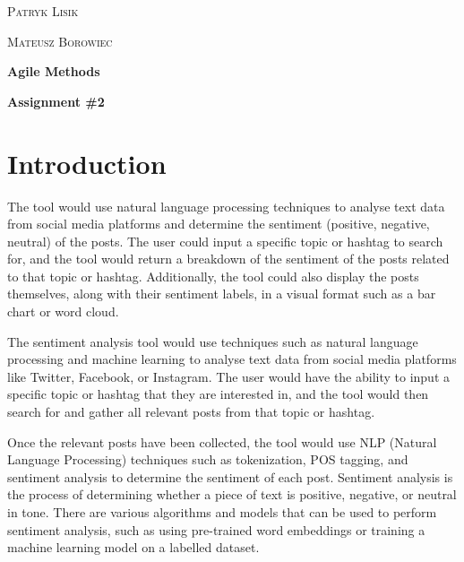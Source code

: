 \documentclass[a4paper,12pt]{article}
\begin{document}
\begin{titlepage}
\vspace{3cm}

\begin{minipage}{0.33 \textwidth}
\begin{flushleft}
\large
\textsc{Patryk Lisik}
\end{flushleft}
\end{minipage}
\hspace{0.2\textwidth}
\begin{minipage}{0.33 \textwidth}
\begin{flushleft}
\large
\textsc{Mateusz Borowiec}
\end{flushleft}
\end{minipage}

\vspace{2cm}

{\center\huge\bfseries Agile Methods \par}

\vspace{1.5cm}
{\center\huge\bfseries Assignment \#2\par}

\end{titlepage}
\section{Introduction}

The tool would use natural language processing techniques to analyse text data from social media platforms and determine the sentiment (positive, negative, neutral) of the posts. The user could input a specific topic or hashtag to search for, and the tool would return a breakdown of the sentiment of the posts related to that topic or hashtag. Additionally, the tool could also display the posts themselves, along with their sentiment labels, in a visual format such as a bar chart or word cloud.

The sentiment analysis tool would use techniques such as natural language processing and machine learning to analyse text data from social media platforms like Twitter, Facebook, or Instagram. The user would have the ability to input a specific topic or hashtag that they are interested in, and the tool would then search for and gather all relevant posts from that topic or hashtag.

Once the relevant posts have been collected, the tool would use NLP (Natural Language Processing) techniques such as tokenization, POS tagging, and sentiment analysis to determine the sentiment of each post. Sentiment analysis is the process of determining whether a piece of text is positive, negative, or neutral in tone. There are various algorithms and models that can be used to perform sentiment analysis, such as using pre-trained word embeddings or training a machine learning model on a labelled dataset.
\end{document}
